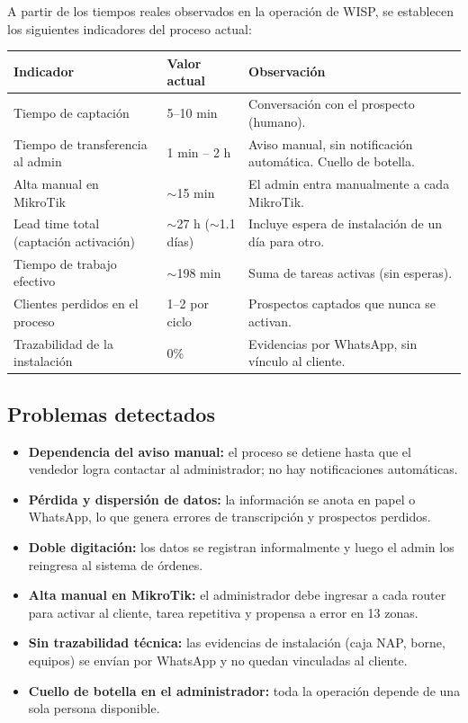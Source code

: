 A partir de los tiempos reales observados en la operación de WISP, se establecen los
siguientes indicadores del proceso actual:

\begin{center}
\label{tab:ind-asis}
\begin{tabularx}{\textwidth}{L{4.3cm} L{2.6cm} X}
\toprule
\textbf{Indicador} & \textbf{Valor actual} & \textbf{Observación} \\
\midrule
Tiempo de captación & 5--10 min & Conversación con el prospecto (humano). \\
Tiempo de transferencia al admin & 1 min -- 2 h &
Aviso manual, sin notificación automática. Cuello de botella. \\
Alta manual en MikroTik & $\sim$15 min & El admin entra manualmente a cada MikroTik. \\
Lead time total (captación \textrightarrow{} activación) & $\sim$27 h ($\sim$1.1 días) &
Incluye espera de instalación de un día para otro. \\
Tiempo de trabajo efectivo & $\sim$198 min & Suma de tareas activas (sin esperas). \\
Clientes perdidos en el proceso & 1--2 por ciclo & Prospectos captados que nunca se activan. \\
Trazabilidad de la instalación & 0\% & Evidencias por WhatsApp, sin vínculo al cliente. \\
\bottomrule
\end{tabularx}
\end{center}

\subsection{Problemas detectados}

\begin{itemize}[leftmargin=1.4em]
  \item \textbf{Dependencia del aviso manual:} el proceso se detiene hasta que el
  vendedor logra contactar al administrador; no hay notificaciones automáticas.
  \item \textbf{Pérdida y dispersión de datos:} la información se anota en papel o
  WhatsApp, lo que genera errores de transcripción y prospectos perdidos.
  \item \textbf{Doble digitación:} los datos se registran informalmente y luego el
  admin los reingresa al sistema de órdenes.
  \item \textbf{Alta manual en MikroTik:} el administrador debe ingresar a cada
  router para activar al cliente, tarea repetitiva y propensa a error en 13 zonas.
  \item \textbf{Sin trazabilidad técnica:} las evidencias de instalación (caja NAP,
  borne, equipos) se envían por WhatsApp y no quedan vinculadas al cliente.
  \item \textbf{Cuello de botella en el administrador:} toda la operación depende de
  una sola persona disponible.
\end{itemize}

